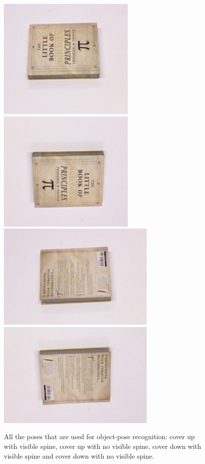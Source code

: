      \begin{figure}
            \includegraphics[width = 0.2\columnwidth]{pics/math_cover1.jpg}
            \includegraphics[width = 0.2\columnwidth]{pics/math_cover1_rot.jpg}
            \includegraphics[width = 0.2\columnwidth]{pics/math_down.jpg}
            \includegraphics[width = 0.2\columnwidth]{pics/math_down_rot.jpg}
            \caption{All the poses that are used for object-pose recognition: cover up with visible spine, cover up with no visible spine, cover down with visible spine and cover down with no visible spine.}
    \label{fig:pose_dataset}
    \end{figure}
        
        







